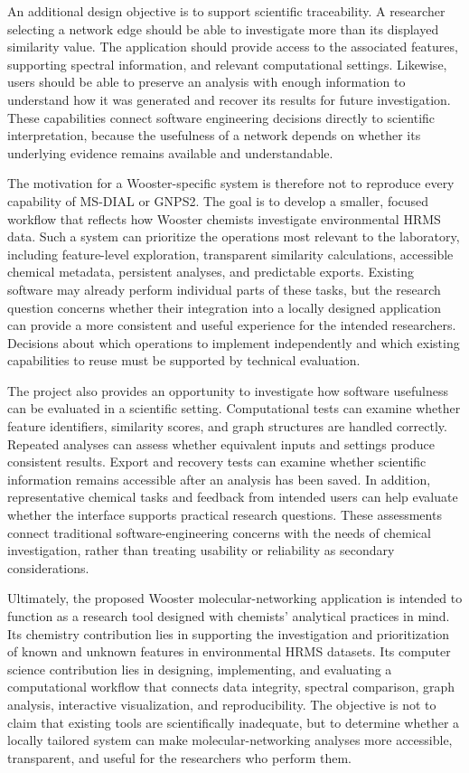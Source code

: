         An additional design objective is to support scientific traceability. A researcher selecting a network edge should be able to investigate more than its displayed similarity value. The application should provide access to the associated features, supporting spectral information, and relevant computational settings. Likewise, users should be able to preserve an analysis with enough information to understand how it was generated and recover its results for future investigation. These capabilities connect software engineering decisions directly to scientific interpretation, because the usefulness of a network depends on whether its underlying evidence remains available and understandable.

        The motivation for a Wooster-specific system is therefore not to reproduce every capability of MS-DIAL or GNPS2. The goal is to develop a smaller, focused workflow that reflects how Wooster chemists investigate environmental HRMS data. Such a system can prioritize the operations most relevant to the laboratory, including feature-level exploration, transparent similarity calculations, accessible chemical metadata, persistent analyses, and predictable exports. Existing software may already perform individual parts of these tasks, but the research question concerns whether their integration into a locally designed application can provide a more consistent and useful experience for the intended researchers. Decisions about which operations to implement independently and which existing capabilities to reuse must be supported by technical evaluation.

        The project also provides an opportunity to investigate how software usefulness can be evaluated in a scientific setting. Computational tests can examine whether feature identifiers, similarity scores, and graph structures are handled correctly. Repeated analyses can assess whether equivalent inputs and settings produce consistent results. Export and recovery tests can examine whether scientific information remains accessible after an analysis has been saved. In addition, representative chemical tasks and feedback from intended users can help evaluate whether the interface supports practical research questions. These assessments connect traditional software-engineering concerns with the needs of chemical investigation, rather than treating usability or reliability as secondary considerations.

        Ultimately, the proposed Wooster molecular-networking application is intended to function as a research tool designed with chemists' analytical practices in mind. Its chemistry contribution lies in supporting the investigation and prioritization of known and unknown features in environmental HRMS datasets. Its computer science contribution lies in designing, implementing, and evaluating a computational workflow that connects data integrity, spectral comparison, graph analysis, interactive visualization, and reproducibility. The objective is not to claim that existing tools are scientifically inadequate, but to determine whether a locally tailored system can make molecular-networking analyses more accessible, transparent, and useful for the researchers who perform them.

